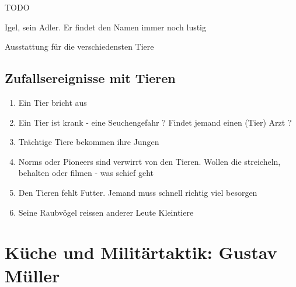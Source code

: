 \begin{npcBox}[title=Jonas Ohnesorg]
    \begin{stressSection}
    \end{stressSection}
    \begin{tabularx}{\textwidth}{ XX }
    \end{tabularx}

    \begin{consequences}
    \item {}
    \item {}
    \item {}
    \end{consequences}

    \begin{npcDescription}
    TODO
    \end{npcDescription}


    \begin{equipment}
    \item Igel, sein Adler. Er findet den Namen immer noch lustig
    \item Ausstattung für die verschiedensten Tiere
    \end{equipment}
\end{npcBox}


\subsection{Zufallsereignisse mit Tieren}

\begin{enumerate}
\item Ein Tier bricht aus
\item Ein Tier ist krank - eine Seuchengefahr ? Findet jemand einen (Tier) Arzt ?
\item Trächtige Tiere bekommen ihre Jungen
\item Norms oder Pioneers sind verwirrt von den Tieren. Wollen die streicheln, behalten oder filmen - was schief geht
\item Den Tieren fehlt Futter. Jemand muss schnell richtig viel besorgen
\item Seine Raubvögel reissen anderer Leute Kleintiere
\end{enumerate}

\newpage
\section{Küche und Militärtaktik: Gustav Müller}

